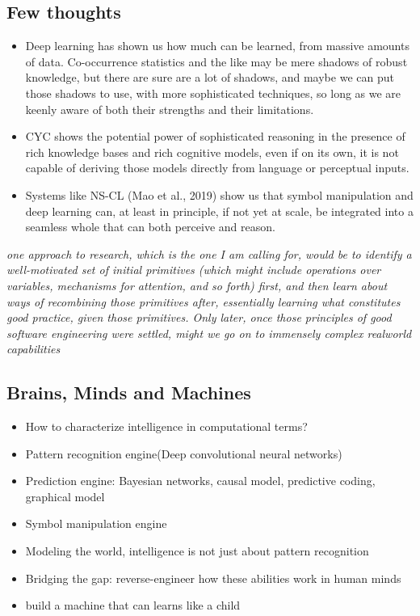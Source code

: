 \documentclass[12pt, letterpaper]{article}
\begin{document}
\subsection{Few thoughts}
\begin{itemize}
	\item Deep learning has shown us how much can be learned, from massive amounts of data. Co-occurrence statistics and the like may be mere shadows of robust knowledge, but there are sure are a lot of shadows, and maybe we can put those shadows to use, with more sophisticated techniques, so long as we are keenly aware of both their strengths and their limitations.
	\item CYC shows the potential power of sophisticated reasoning in the presence of rich knowledge bases and rich cognitive models, even if on its own, it is not capable of deriving those models directly from language or perceptual inputs.
	\item Systems like NS-CL (Mao et al., 2019) show us that symbol manipulation and deep learning can, at least in principle, if not yet at scale, be integrated into a seamless whole that can both perceive and reason.
\end{itemize}

\emph{one approach to research, which is the one I am 
calling for, would be to identify a well-motivated set of initial primitives (which might 
include operations over variables, mechanisms for attention, and so forth) first, and
then learn about ways of recombining those primitives after, essentially learning what
constitutes good practice, given those primitives. Only later, once those principles of
good software engineering were settled, might we go on to immensely complex realworld capabilities}

\subsection{Brains, Minds and Machines}
\begin{itemize}
	\item How to characterize intelligence in computational terms?
	\item Pattern recognition engine(Deep convolutional neural networks)
	\item Prediction engine: Bayesian networks, causal model, predictive coding, graphical model
	\item Symbol manipulation engine
	\item Modeling the world, intelligence is not just about pattern recognition
	\item Bridging the gap: reverse-engineer how these abilities work in human minds
	\item build a machine that can learns like a child
\end{itemize}
\end{document}
